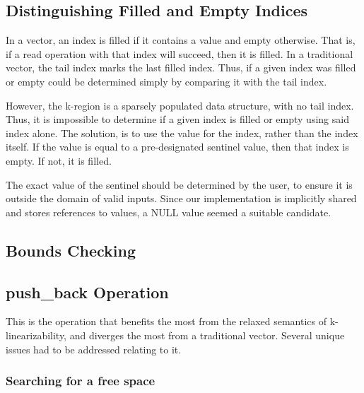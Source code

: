 \documentclass{sigplanconf}
\begin{document}
\subsection{Distinguishing Filled and Empty Indices}

In a vector, an index is filled if it contains a value and empty otherwise. That is, if a read operation with that index will succeed, then it is filled. In a traditional vector, the tail index marks the last filled index. Thus, if a given index was filled or empty could be determined simply by comparing it with the tail index.

However, the k-region is a sparsely populated data structure, with no tail index. Thus, it is impossible to determine if a given index is filled or empty using said index alone. The solution, is to use the value for the index, rather than the index itself. If the value is equal to a pre-designated sentinel value, then that index is empty. If not, it is filled.

The exact value of the sentinel should be determined by the user, to ensure it is outside the domain of valid inputs. Since our implementation is implicitly shared and stores references to values, a NULL value seemed a suitable candidate.

\subsection{Bounds Checking}

\subsection{push\_back Operation}

This is the operation that benefits the most from the relaxed semantics of k-linearizability, and diverges the most from a traditional vector. Several unique issues had to be addressed relating to it.

\subsubsection{Searching for a free space}

\end{document}

